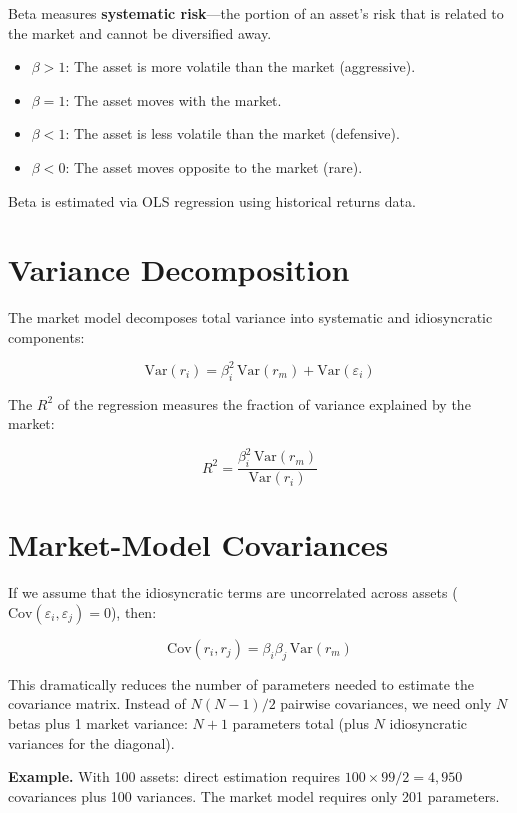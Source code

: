\documentclass[11pt,letterpaper]{report}
\begin{document}
Beta measures \textbf{systematic risk}---the portion of an asset's risk that is related to the market and cannot be diversified away.

\begin{itemize}
  \item $\beta > 1$: The asset is more volatile than the market (aggressive).
  \item $\beta = 1$: The asset moves with the market.
  \item $\beta < 1$: The asset is less volatile than the market (defensive).
  \item $\beta < 0$: The asset moves opposite to the market (rare).
\end{itemize}

Beta is estimated via OLS regression using historical returns data.

\section{Variance Decomposition}


The market model decomposes total variance into systematic and idiosyncratic components:

$$\text{Var}(r_i) = \beta_i^2 \, \text{Var}(r_m) + \text{Var}(\varepsilon_i)$$

The $R^2$ of the regression measures the fraction of variance explained by the market:

$$R^2 = \frac{\beta_i^2 \, \text{Var}(r_m)}{\text{Var}(r_i)}$$

\section{Market-Model Covariances}


If we assume that the idiosyncratic terms are uncorrelated across assets ($\text{Cov}(\varepsilon_i, \varepsilon_j) = 0$), then:

$$\text{Cov}(r_i, r_j) = \beta_i \beta_j \, \text{Var}(r_m)$$

This dramatically reduces the number of parameters needed to estimate the covariance matrix.  Instead of $N(N-1)/2$ pairwise covariances, we need only $N$ betas plus 1 market variance: $N + 1$ parameters total (plus $N$ idiosyncratic variances for the diagonal).

\textbf{Example.}  With 100 assets: direct estimation requires $100 \times 99 / 2 = 4{,}950$ covariances plus 100 variances.  The market model requires only 201 parameters.
\end{document}
